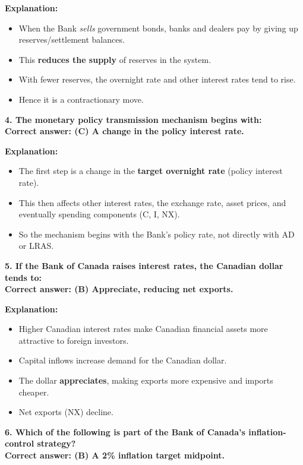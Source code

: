 \documentclass[12pt]{article}
\begin{document}
\textbf{Explanation:}
\begin{itemize}
    \item When the Bank \emph{sells} government bonds, banks and dealers pay by giving up reserves/settlement balances.
    \item This \textbf{reduces the supply} of reserves in the system.
    \item With fewer reserves, the overnight rate and other interest rates tend to rise.
    \item Hence it is a contractionary move.
\end{itemize}



\textbf{4. The monetary policy transmission mechanism begins with:}\\
\textbf{Correct answer: (C) A change in the policy interest rate.}

\textbf{Explanation:}
\begin{itemize}
    \item The first step is a change in the \textbf{target overnight rate} (policy interest rate).
    \item This then affects other interest rates, the exchange rate, asset prices, and eventually spending components (C, I, NX).
    \item So the mechanism begins with the Bank's policy rate, not directly with AD or LRAS.
\end{itemize}

\bigskip

\textbf{5. If the Bank of Canada raises interest rates, the Canadian dollar tends to:}\\
\textbf{Correct answer: (B) Appreciate, reducing net exports.}

\textbf{Explanation:}
\begin{itemize}
    \item Higher Canadian interest rates make Canadian financial assets more attractive to foreign investors.
    \item Capital inflows increase demand for the Canadian dollar.
    \item The dollar \textbf{appreciates}, making exports more expensive and imports cheaper.
    \item Net exports (NX) decline.
\end{itemize}

\bigskip

\textbf{6. Which of the following is part of the Bank of Canada's inflation-control strategy?}\\
\textbf{Correct answer: (B) A 2\% inflation target midpoint.}
\end{document}

